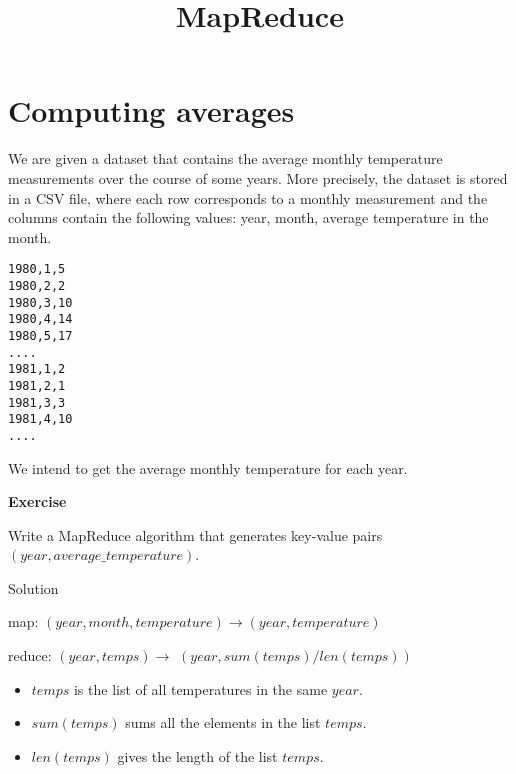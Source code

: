 \documentclass[
]{article}
\title{MapReduce}
\author{}
\date{\vspace{-2.5em}}
\providecommand{\tightlist}{%
  \setlength{\itemsep}{0pt}\setlength{\parskip}{0pt}}
\newenvironment{infobox}[1]
  {
  \begin{itemize}
  \renewcommand{\labelitemi}{
    \raisebox{-.7\height}[0pt][0pt]{
      
    }
  }
  \setlength{\fboxsep}{1em}
  \begin{whitebox}
  \item
  }
  {
  \end{whitebox}
  \end{itemize}
  }
\theoremstyle{definition}
\theoremstyle{definition}
\theoremstyle{definition}
\theoremstyle{remark}
\let\BeginKnitrBlock\begin \let\EndKnitrBlock\end
\begin{document}
\maketitle

\hypertarget{computing-averages}{%
\section{Computing averages}\label{computing-averages}}

We are given a dataset that
contains the average monthly
temperature measurements
over the course of some years.
More precisely, the dataset is stored in a CSV file,
where each row corresponds to a monthly
measurement and the columns contain the following values:
year, month, average temperature in the month.

\begin{verbatim}
1980,1,5
1980,2,2
1980,3,10
1980,4,14
1980,5,17
....
1981,1,2
1981,2,1
1981,3,3
1981,4,10
....
\end{verbatim}

We intend to get the average monthly temperature for each year.

\begin{infobox}{exercisebox}

\textbf{Exercise}

\BeginKnitrBlock{exercise}
\protect\hypertarget{exr:unnamed-chunk-1}{}{\label{exr:unnamed-chunk-1} }
Write a MapReduce algorithm that generates key-value pairs
\((year, average\_temperature)\).
\EndKnitrBlock{exercise}

\end{infobox}

Solution

\begin{infobox}{exercisebox}

map: \((year, month, temperature) \rightarrow (year, temperature)\)

reduce: \((year, temps) \rightarrow\) \((year, sum(temps)/len(temps))\)

\begin{itemize}
\tightlist
\item
  \(temps\) is the list of all temperatures in the same \(year\).
\item
  \(sum(temps)\) sums all the elements in the list \(temps\).
\item
  \(len(temps)\) gives the length of the list \(temps\).
\end{itemize}

\end{infobox}
\end{document}
